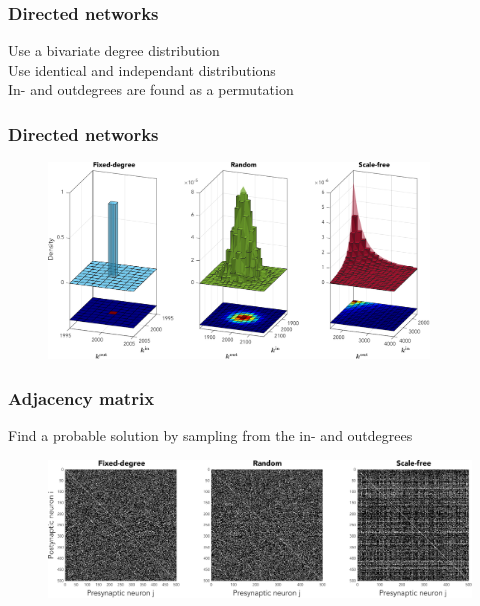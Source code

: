 \begin{frame}
\frametitle{Directed networks} 
Use a bivariate degree distribution\\
\tabitem Use identical and independant distributions \\
\tabitem In- and outdegrees are found as a permutation
\end{frame}

\begin{frame}
\frametitle{Directed networks} 
\begin{figure}[ht]
\centering
\includegraphics[width = 0.9\textwidth]{../Figures/Distributions/2D.pdf}
\label{fig:2Ddistributions}
\end{figure}
\end{frame}

\begin{frame}
\frametitle{Adjacency matrix} 
Find a probable solution by sampling from the in- and outdegrees
\begin{figure}[H]
\centering
\includegraphics[width = \textwidth]{../Figures/Adjacency_matrices.pdf}
\label{fig:adjacencymatrices}
\end{figure}
\end{frame}

